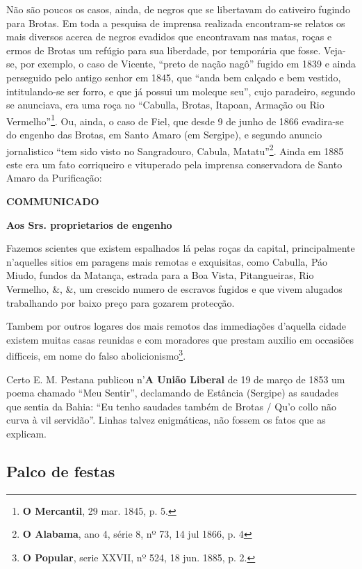 Não são poucos os casos, ainda, de negros que se libertavam do cativeiro fugindo para Brotas. Em toda a pesquisa de imprensa realizada encontram-se relatos os mais diversos acerca de negros evadidos que encontravam nas matas, roças e ermos de Brotas um refúgio para sua liberdade, por temporária que fosse. Veja-se, por exemplo, o caso de Vicente, ``preto de nação nagô'' fugido em 1839 e ainda perseguido pelo antigo senhor em 1845, que ``anda bem calçado e bem vestido, intitulando-se ser forro, e que já possui um moleque seu'', cujo paradeiro, segundo se anunciava, era uma roça no ``Cabulla, Brotas, Itapoan, Armação ou Rio Vermelho''\footnote{\textbf{O Mercantil}, 29 mar. 1845, p. 5.}. Ou, ainda, o caso de Fiel, que desde 9 de junho de 1866 evadira-se do engenho das Brotas, em Santo Amaro (em Sergipe), e segundo anuncio jornalistico ``tem sido visto no Sangradouro, Cabula, Matatu''\footnote{\textbf{O Alabama}, ano 4, série 8, nº 73, 14 jul 1866, p. 4}. Ainda em 1885 este era um fato corriqueiro e vituperado pela imprensa conservadora de Santo Amaro da Purificação:

\begin{citacao}
\textbf{COMMUNICADO}

\textbf{Aos Srs. proprietarios de engenho}

Fazemos scientes que existem espalhados lá pelas roças da capital, principalmente n'aquelles sitios em paragens mais remotas e exquisitas, como Cabulla, Páo Miudo, fundos da Matança, estrada para a Boa Vista, Pitangueiras, Rio Vermelho, \&, \&, um crescido numero de escravos fugidos e que vivem alugados trabalhando por baixo preço para gozarem protecção.

Tambem por outros logares dos mais remotos das immediações d'aquella cidade existem muitas casas reunidas e com moradores que prestam auxilio em occasiões difficeis, em nome do falso abolicionismo\footnote{\textbf{O Popular}, serie XXVII, nº 524, 18 jun. 1885, p. 2.}.
\end{citacao}

Certo E. M. Pestana publicou n'\textbf{A União Liberal} de 19 de março de 1853 um poema chamado ``Meu Sentir'', declamando de Estância (Sergipe) as saudades que sentia da Bahia: ``Eu tenho saudades também de Brotas / Qu'o collo não curva à vil servidão''. Linhas talvez enigmáticas, não fossem os fatos que as explicam.

\subsection{Palco de festas}

